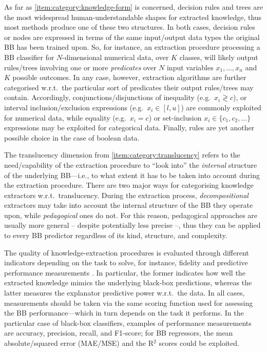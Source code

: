 \documentclass[12pt,a4paper,openright,twoside]{book}
\begin{document}
As far as \cref{item:category:knowledge-form} is concerned, decision rules \cite{freitas2014comprehensible,huysmans2011empirical,murphy1991id2} and trees \cite{quinlan1993c4,simplifyingdt-ijmms27} are the most widespread human-understandable shapes for extracted knowledge, thus most methods produce one of these two structures.
%
In both cases, decision rules or nodes are expressed in terms of the same input/output data types the original BB has been trained upon.
%
So, for instance, an extraction procedure processing a BB classifier for $N$-dimensional numerical data, over $K$ classes, will likely output rules/trees involving one or more \emph{predicates} over $N$ input variables $x_1, \ldots, x_n$ and $K$ possible outcomes.
%
In any case, however, extraction algorithms are further categorised w.r.t.\ the particular sort of predicates their output rules/trees may contain.
%
Accordingly, conjunctions/disjunctions of inequality (e.g.\ $x_i \gtrless c$), or interval inclusion/exclusion expressions (e.g.\ $x_i \in [l, u]$) are commonly exploited for numerical data, while equality (e.g.\ $x_i = c$) or set-inclusion $x_i \in \{c_1, c_2, \ldots \}$ expressions may be exploited for categorical data.
%
Finally, \mofn{} rules are yet another possible choice in the case of boolean data.

The translucency dimension \cite{AndrewsDT95} from \cref{item:category:translucency} refers to the need/capability of the extraction procedure to ``look into'' the \emph{internal} structure of the underlying BB---i.e., to what extent it has to be taken into account during the extraction procedure.
%
There are two major ways for categorising knowledge extractors w.r.t.\ translucency.
%
During the extraction process, \textit{decompositional} extractors may take into account the internal structure of the BB they operate upon, while \emph{pedagogical} ones do not.
%
For this reason, pedagogical approaches are usually more general -- despite potentially less precise --, thus they can be applied to every BB predictor regardless of its kind, structure, and complexity.

The quality of knowledge-extraction procedures is evaluated through different indicators depending on the task to solve, for instance, fidelity and predictive performance measurements \cite{towell1993extracting}.
%
In particular, the former indicates how well the extracted knowledge mimics the underlying black-box predictions, whereas the latter measures the explanator predictive power w.r.t.\ the data.
%
In all cases, measurements should be taken via the same scoring function used for assessing the BB performance---which in turn depends on the task it performs.
%
In the particular case of black-box classifiers, examples of performance measurements are accuracy, precision, recall, and F1-score; for BB regressors, the mean absolute/squared error (MAE/MSE) and the R${^2}$ scores could be exploited.
\end{document}

